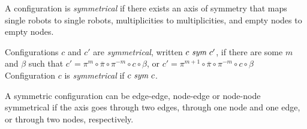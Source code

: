 A configuration is \emph{symmetrical} if there exists an axis of
symmetry that maps single robots to single robots, multiplicities
to multiplicities, and empty nodes to empty nodes.
\begin{definition}[Symmetries]
\label{def:ConfSym}
Configurations $c$ and $c'$ are \emph{symmetrical}, written $c \ \sym \ c'$, if there are some $m$ and $\beta$ such that $c' = \pi^m \circ \overline{\pi} \circ \pi^{-m} \circ c \circ \beta$, or $c' = \pi^{m+1} \circ \overline{\pi} \circ \pi^{-m} \circ c \circ \beta$\\
Configuration $c$ is \emph{symmetrical} if $c \ \sym \ c$.
\end{definition}
A symmetric configuration can be edge-edge, node-edge or node-node symmetrical if the axis goes through two edges, through one node and one edge, or through two nodes, respectively.

